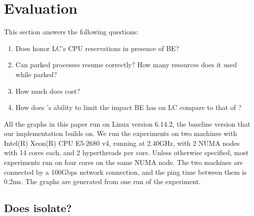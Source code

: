 \section{Evaluation}
\label{s:eval}

This section answers the following questions:
\begin{enumerate}
    \item Does \schedbe{} honor LC's CPU reservations in presence of BE?
    \item Can parked processes resume correctly? How many resources does it used
    while parked?
    \item How much does \schedbe{} cost?
    \item How does \schedbe{}'s ability to limit the impact BE has on LC compare
    to that of \schedidle{}?
\end{enumerate}

All the graphs in this paper run on Linux version 6.14.2, the baseline version
that our implementation builds on. We run the experiments on two machines with
Intel(R) Xeon(R) CPU E5-2680 v4, running at 2.40GHz, with 2 NUMA nodes with 14
cores each, and 2 hyperthreads per core. Unless otherwise specified, most
experiments run on four cores on the same NUMA node. The two machines are
connected by a 100Gbps network connection, and the ping time between them is
0.2ms. The graphs are generated from one run of the experiment.

\subsection{Does \schedbe{} isolate?}


